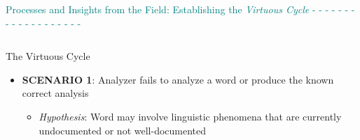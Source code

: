 \documentclass[usenames,dvipsnames]{beamer}
\begin{document}
\begin{frame}[fragile]

\vspace{28pt}




{\LARGE \textcolor{orange}{\textbf{\PencilLeftDown}} \textcolor{teal}{Processes and Insights from the Field: Establishing the \textit{Virtuous Cycle} - - - - - - - - - - - - - - - - - - -}}

\vspace{28pt}

\begin{columns}

\begin{column}{0.3\textwidth}
\begin{block}{The Virtuous Cycle}

\begin{itemize}
\setlength\itemsep{48pt}
    \item \textbf{SCENARIO 1}: Analyzer fails to analyze a word or produce the known correct analysis
    \vspace{24pt}
    \begin{itemize}
    \setlength\itemsep{24pt}
    \item \textit{Hypothesis}: Word may involve linguistic phenomena that are currently undocumented or not well-documented
            

\end{itemize}
\end{itemize}
\end{block}
\end{column}
\end{columns}
\end{frame}
\end{document}
